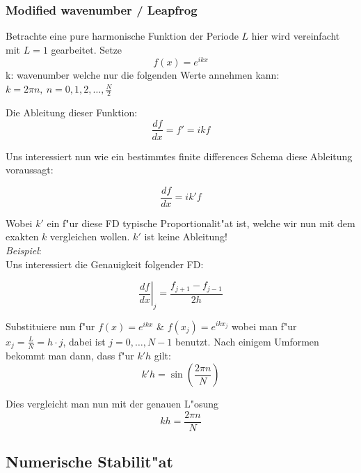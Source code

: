 \documentclass[german, 10pt, a4paper, twocolumn]{scrartcl}
\begin{document}
\subsubsection{Modified wavenumber / Leapfrog}

Betrachte eine pure harmonische Funktion der Periode $L$ hier wird vereinfacht mit $L=1$ gearbeitet. Setze
\begin{displaymath}
	f(x)=e^{ikx}
\end{displaymath}
k: wavenumber welche nur die folgenden Werte annehmen kann: $k=2\pi n,\: n= 0,1,2,\ldots,\frac{N}{2}$

Die Ableitung dieser Funktion:
\begin{displaymath}
	\frac{df}{dx} = f' = ikf
\end{displaymath}

Uns interessiert nun wie ein bestimmtes finite differences Schema diese Ableitung voraussagt:

\begin{displaymath}
	\frac{df}{dx} = ik' f
\end{displaymath}

Wobei $k'$ ein f"ur diese FD typische Proportionalit"at ist, welche wir nun mit dem exakten $k$ vergleichen wollen. $k'$ ist keine Ableitung!\\

\textit{Beispiel}:\\
Uns interessiert die Genauigkeit folgender FD:

\begin{displaymath}
	\left . \frac{df}{dx}\right |_j = \frac{f_{j+1}-f_{j-1}}{2h}
\end{displaymath}

Substituiere nun f"ur $f(x)=e^{ikx}$ \& $f(x_j)=e^{ikx_j}$ wobei man f"ur $x_j = \frac{L}{N} = h\cdotp j$, dabei ist $j=0,\ldots, N-1$ benutzt. Nach einigem Umformen bekommt man dann, dass f"ur $k'h$ gilt:
\begin{displaymath}
	k'h = \sin\left( \frac{2\pi n}{N} \right )
\end{displaymath}

Dies vergleicht man nun mit der genauen L"osung
\begin{displaymath}
	k h = \frac{2\pi n}{N}
\end{displaymath}

\subsection{Numerische Stabilit"at}
\end{document}
